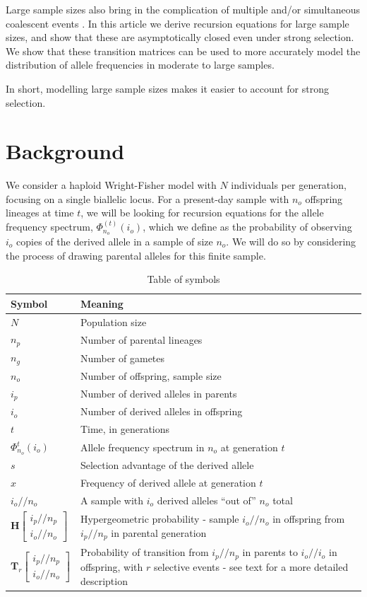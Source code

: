 \documentclass[review]{elsarticle}
\newcommand{\afs}[2]{\Phi_{#1}^{(#2)}}
\newcommand{\dslash}{/\!\!/}
\newcommand{\Coalc}[4]{\begin{bmatrix}#1\dslash #2 \\ #3\dslash #4 \end{bmatrix}}
\begin{document}
Large sample sizes also bring in the complication of multiple and/or simultaneous coalescent events
\citep{BhaskarEtAl2014}. In this article we derive recursion equations for large sample sizes, and
show that these are asymptotically closed even under strong selection. We show that these transition
matrices can be used to more accurately model the distribution of allele frequencies in moderate to
large samples.

In short, modelling large sample sizes makes it easier to account for strong selection. 

\section{Background}
\label{sec:background}

We consider a haploid Wright-Fisher model with $N$ individuals per generation, focusing on a single
biallelic locus. For a present-day sample with $n_o$ offspring lineages at time $t$, we will be
looking for recursion equations for the allele frequency spectrum, $\afs{n_o}{t}(i_o)$, which we
define as the probability of observing $i_o$ copies of the derived allele in a sample of size $n_o$.
We will do so by considering the process of drawing parental alleles for this finite sample.

\begin{table}
  \centering
  \begin{tabular}{l|p{100mm}}
    Symbol & Meaning\\
    \hline
    $N$ & Population size\\
    $n_p$ & Number of parental lineages\\
    $n_g$ & Number of gametes\\
    $n_o$ & Number of offspring, sample size\\
    $i_p$ & Number of derived alleles in parents\\
    $i_o$ & Number of derived alleles in offspring\\
    $t$ & Time, in generations\\
    $\Phi_{n_o}^{t}(i_o)$ & Allele frequency spectrum in $n_o$ at generation $t$\\
    $s$ & Selection advantage of the derived allele\\
    $x$ & Frequency of derived allele at generation $t$\\
    $i_o \dslash n_o$ & A sample with $i_o$ derived alleles ``out of'' $n_o$ total\\
    $\mathbf{H}\Coalc{i_p}{n_p}{i_o}{n_o}$ & Hypergeometric probability -
                                             sample $i_o \dslash n_o$ in offspring from $i_p \dslash n_p$ in parental generation\\
    $\mathbf{T}_{r}\Coalc{i_p}{n_p}{i_o}{n_o}$ & Probability of transition from $i_p \dslash n_p$ in parents
                                                 to $i_o \dslash i_o$ in offspring, with $r$ selective events -
                                                 see text for a more detailed description\\
  \end{tabular}
  \caption{\label{tab:symbols} Table of symbols}
\end{table}
\end{document}
